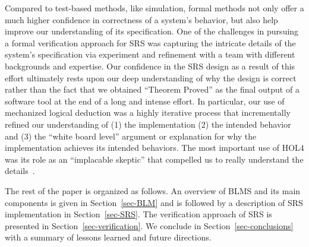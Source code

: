 \documentclass{llncs}
\begin{document}
Compared to test-based methods, like simulation, formal methods not only offer a much higher confidence in correctness of a system's behavior, but also help improve our understanding of its specification.
One of the challenges in pursuing a formal verification approach for SRS was capturing the intricate details of the system's specification via experiment and refinement with a team with different backgrounds and expertise.
Our confidence in the SRS design as a result of this effort ultimately rests upon our deep understanding of why the design is correct rather than the fact that we obtained ``Theorem Proved'' as the final output of a software tool at the end of a long and intense effort.
In particular, our use of mechanized logical deduction was a highly iterative process that incrementally refined our understanding of (1) the implementation (2) the intended behavior and (3) the ``white board level'' argument or explanation for why the implementation achieves its intended behaviors.
The most important use of HOL4 was its role as an ``implacable skeptic'' that compelled us to really understand the details~\cite{rushby}.

The rest of the paper is organized as follows.
An overview of BLMS and its main components is given in Section~\ref{sec-BLM} and is followed by a description of SRS implementation in Section~\ref{sec-SRS}.
The verification approach of SRS is presented in Section~\ref{sec-verification}.
We conclude in Section~\ref{sec-conclusions} with a summary of lessons learned and future directions.





\end{document}
